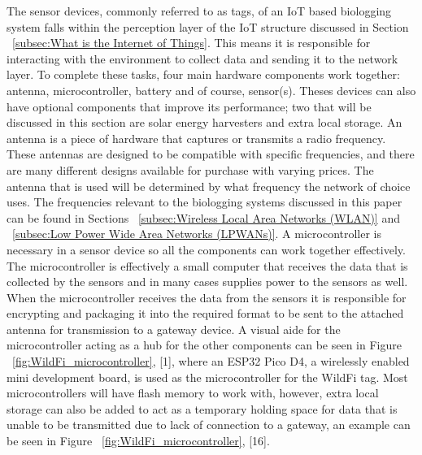 \documentclass[sigplan,screen,nonacm]{acmart}
\begin{document}
The sensor devices, commonly referred to as tags, of an IoT based biologging system falls within the perception layer of the IoT 
structure discussed in Section ~\ref{subsec:What is the Internet of Things}. This means it is responsible 
for interacting with the environment to collect data and sending it to the network layer. To complete these 
tasks, four main hardware components work together: antenna, microcontroller, battery and of course, sensor(s). 
Theses devices can also have optional components that improve its performance; two that will be discussed in 
this section are solar energy harvesters and extra local storage. 
An antenna is a piece of hardware that captures or transmits a radio frequency. These antennas are designed to 
be compatible with specific frequencies\cite{Sheldon_2023}, and there are many different designs available for 
purchase with varying prices. The antenna that is used will be determined by what frequency the network of choice 
uses. The frequencies relevant to the biologging systems discussed in this paper can be found in Sections 
~\ref{subsec:Wireless Local Area Networks (WLAN)} and ~\ref{subsec:Low Power Wide Area Networks (LPWANs)}.
A microcontroller is necessary in a sensor device so all the components can work together effectively. The 
microcontroller is effectively a small computer that receives the data that is collected by the sensors and in 
many cases supplies power to the sensors as well. When the microcontroller receives the data from the sensors 
it is responsible for encrypting and packaging it into the required format to be sent to the attached antenna 
for transmission to a gateway device. A visual aide for the microcontroller acting as a hub for the other 
components can be seen in Figure ~\ref{fig:WildFi_microcontroller}, [1], where an ESP32 Pico D4, a wirelessly enabled mini development board,  is used as the 
microcontroller for the WildFi tag. Most microcontrollers will have flash memory to work with, however, 
extra local storage can also be added to act as a temporary holding space for data that is unable to be 
transmitted due to lack of connection to a gateway, an example can be seen in Figure ~\ref{fig:WildFi_microcontroller}, [16].
\end{document}
